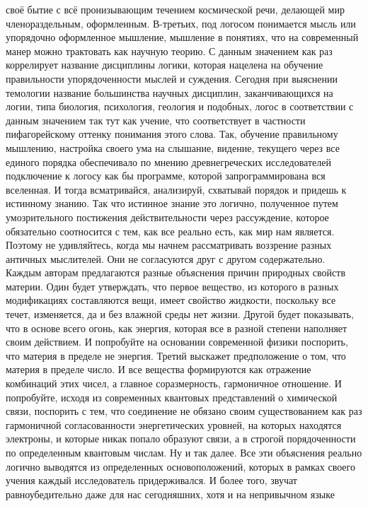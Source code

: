 своё бытие с всё пронизывающим течением космической речи, делающей мир
членораздельным, оформленным. В-третьих, под логосом понимается мысль или
упорядочно оформленное мышление, мышление в понятиях, что на современный манер
можно трактовать как научную теорию. С данным значением как раз коррелирует
название дисциплины логики, которая нацелена на обучение правильности
упорядоченности мыслей и суждения. Сегодня при выяснении темологии название
большинства научных дисциплин, заканчивающихся на логии, типа биология,
психология, геология и подобных, логос в соответствии с данным значением так тут
как учение, что соответствует в частности пифагорейскому оттенку понимания этого
слова. Так, обучение правильному мышлению, настройка своего ума на слышание,
видение, текущего через все единого порядка обеспечивало по мнению
древнегреческих исследователей подключение к логосу как бы программе, которой
запрограммирована вся вселенная. И тогда всматривайся, анализируй, схватывай
порядок и придешь к истинному знанию. Так что истинное знание это логично,
полученное путем умозрительного постижения действительности через рассуждение,
которое обязательно соотносится с тем, как все реально есть, как мир нам
является. Поэтому не удивляйтесь, когда мы начнем рассматривать воззрение разных
античных мыслителей. Они не согласуются друг с другом содержательно. Каждым
авторам предлагаются разные объяснения причин природных свойств материи. Один
будет утверждать, что первое вещество, из которого в разных модификациях
составляются вещи, имеет свойство жидкости, поскольку все течет, изменяется, да
и без влажной среды нет жизни. Другой будет показывать, что в основе всего
огонь, как энергия, которая все в разной степени наполняет своим действием. И
попробуйте на основании современной физики поспорить, что материя в пределе не
энергия. Третий выскажет предположение о том, что материя в пределе число. И все
вещества формируются как отражение комбинаций этих чисел, а главное
соразмерность, гармоничное отношение. И попробуйте, исходя из современных
квантовых представлений о химической связи, поспорить с тем, что соединение не
обязано своим существованием как раз гармоничной согласованности энергетических
уровней, на которых находятся электроны, и которые никак попало образуют связи,
а в строгой порядоченности по определенным квантовым числам. Ну и так далее. Все
эти объяснения реально логично выводятся из определенных основоположений,
которых в рамках своего учения каждый исследователь придерживался. И более того,
звучат равноубедительно даже для нас сегодняшних, хотя и на непривычном языке
